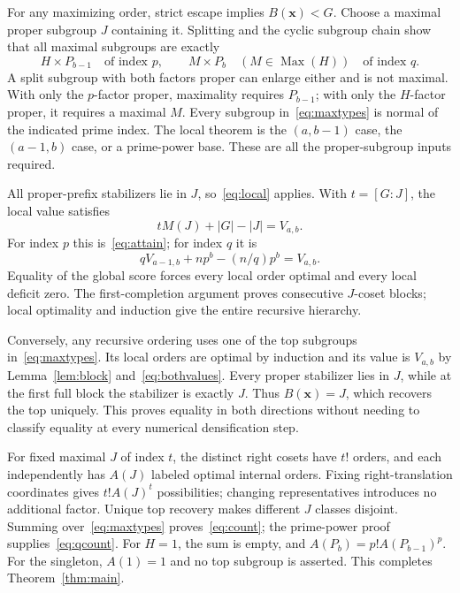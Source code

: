 \documentclass[11pt,letterpaper]{article}
\theoremstyle{definition}\newtheorem{definition}{Definition}
\newcommand{\Max}{\operatorname{Max}}
\begin{document}
For any maximizing order, strict escape implies $B(\mathbf{x})<G$. Choose a maximal proper subgroup $J$ containing it. Splitting and the cyclic subgroup chain show that all maximal subgroups are exactly
\begin{equation}
H\times P_{b-1}\quad\text{of index }p,
\qquad M\times P_b\quad(M\in\Max(H))\quad\text{of index }q.\label{eq:maxtypes}
\end{equation}
A split subgroup with both factors proper can enlarge either and is not maximal. With only the $p$-factor proper, maximality requires $P_{b-1}$; with only the $H$-factor proper, it requires a maximal $M$. Every subgroup in~\eqref{eq:maxtypes} is normal of the indicated prime index. The local theorem is the $(a,b-1)$ case, the $(a-1,b)$ case, or a prime-power base. These are all the proper-subgroup inputs required.

All proper-prefix stabilizers lie in $J$, so~\eqref{eq:local} applies. With $t=[G:J]$, the local value satisfies
\begin{equation}
tM(J)+|G|-|J|=V_{a,b}.\label{eq:bothvalues}
\end{equation}
For index $p$ this is~\eqref{eq:attain}; for index $q$ it is
\[
qV_{a-1,b}+np^b-(n/q)p^b=V_{a,b}.
\]
Equality of the global score forces every local order optimal and every local deficit zero. The first-completion argument proves consecutive $J$-coset blocks; local optimality and induction give the entire recursive hierarchy.

Conversely, any recursive ordering uses one of the top subgroups in~\eqref{eq:maxtypes}. Its local orders are optimal by induction and its value is $V_{a,b}$ by Lemma~\ref{lem:block} and~\eqref{eq:bothvalues}. Every proper stabilizer lies in $J$, while at the first full block the stabilizer is exactly $J$. Thus $B(\mathbf{x})=J$, which recovers the top uniquely. This proves equality in both directions without needing to classify equality at every numerical densification step.

For fixed maximal $J$ of index $t$, the distinct right cosets have $t!$ orders, and each independently has $A(J)$ labeled optimal internal orders. Fixing right-translation coordinates gives $t!A(J)^t$ possibilities; changing representatives introduces no additional factor. Unique top recovery makes different $J$ classes disjoint. Summing over~\eqref{eq:maxtypes} proves~\eqref{eq:count}; the prime-power proof supplies~\eqref{eq:qcount}. For $H=1$, the sum is empty, and $A(P_b)=p!A(P_{b-1})^p$. For the singleton, $A(1)=1$ and no top subgroup is asserted. This completes Theorem~\ref{thm:main}.
\end{document}
